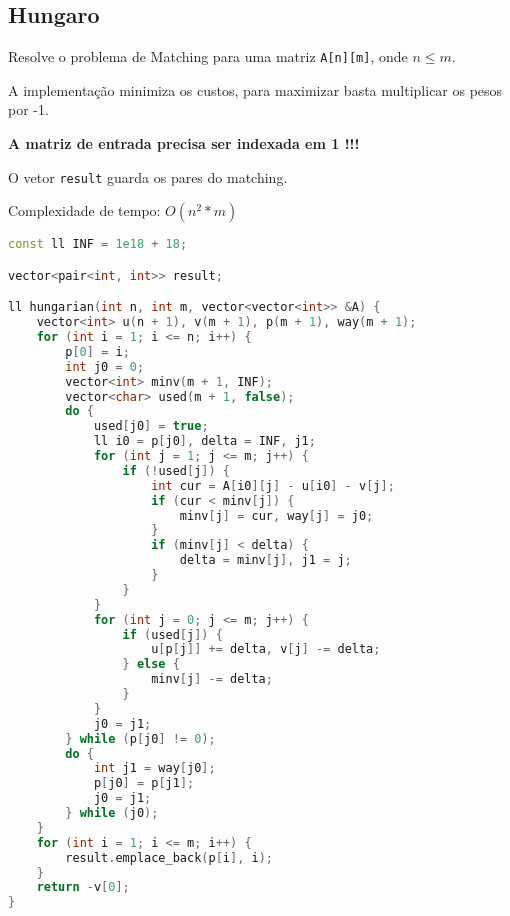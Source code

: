 \documentclass[11pt, a4paper, oneside]{book}
\begin{document}
\subsection{Hungaro}


Resolve o problema de Matching para uma matriz \lstinline{A[n][m]}, onde $n \leq m$.



A implementação minimiza os custos, para maximizar basta multiplicar os pesos por -1.



\textbf{A matriz de entrada precisa ser indexada em 1 !!!}



O vetor \lstinline{result} guarda os pares do matching.



Complexidade de tempo: $O(n^2 * m)$
\hfill

\begin{multicols}{2}
\begin{lstlisting}[language=C++]
const ll INF = 1e18 + 18;

vector<pair<int, int>> result;

ll hungarian(int n, int m, vector<vector<int>> &A) {
    vector<int> u(n + 1), v(m + 1), p(m + 1), way(m + 1);
    for (int i = 1; i <= n; i++) {
        p[0] = i;
        int j0 = 0;
        vector<int> minv(m + 1, INF);
        vector<char> used(m + 1, false);
        do {
            used[j0] = true;
            ll i0 = p[j0], delta = INF, j1;
            for (int j = 1; j <= m; j++) {
                if (!used[j]) {
                    int cur = A[i0][j] - u[i0] - v[j];
                    if (cur < minv[j]) {
                        minv[j] = cur, way[j] = j0;
                    }
                    if (minv[j] < delta) {
                        delta = minv[j], j1 = j;
                    }
                }
            }
            for (int j = 0; j <= m; j++) {
                if (used[j]) {
                    u[p[j]] += delta, v[j] -= delta;
                } else {
                    minv[j] -= delta;
                }
            }
            j0 = j1;
        } while (p[j0] != 0);
        do {
            int j1 = way[j0];
            p[j0] = p[j1];
            j0 = j1;
        } while (j0);
    }
    for (int i = 1; i <= m; i++) {
        result.emplace_back(p[i], i);
    }
    return -v[0];
}
\end{lstlisting}
\end{multicols}

\hfill
\end{document}

